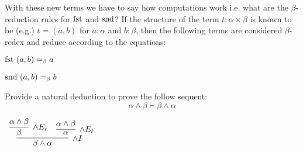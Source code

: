 \documentclass{book}
\begin{document}
        With these new terms we have to say how computations work i.e. what are the $\beta$-reduction rules for $\text{fst}$ and  $\text{snd}$? If the structure of the term $t : \alpha \times \beta$ is known to be (e.g.) $t = (a,b)$ for $a: \alpha$ and $b: \beta$, then the following terms are considered $\beta$-redex and reduce according to the equations: 

        \begin{center}
          $\text{fst} \ (a,b) =_{\beta} a$ 
      
          $\text{snd} \ (a,b) =_{\beta} b$ 
        \end{center}
      
        \begin{eg}

            Provide a natural deduction to prove the follow sequent: $$ \alpha \land \beta \vdash \beta \land \alpha $$
    
            \begin{center}
                $\begin{array}{c}
                    \infer[\land I]{\beta \land \alpha}
                        {\infer[\land E_{r}]{\beta}
                            {\alpha \land \beta}
                        &
                        \infer[\land E_{l}]{\alpha}
                            {\alpha \land \beta}}
                \end{array}$
            \end{center}
            
        \end{eg}
    
\end{document}
